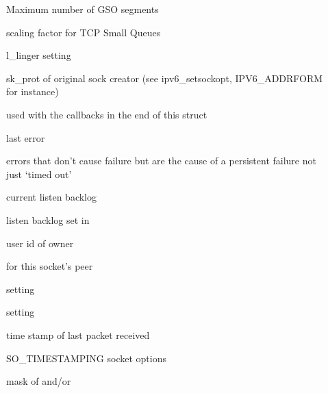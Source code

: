 \documentclass[a4paper,8pt,english]{sphinxmanual}
\begin{document}
\begin{description}
\item[{}] \leavevmode
Maximum number of GSO segments

\item[{}] \leavevmode
scaling factor for TCP Small Queues

\item[{}] \leavevmode
{} l\_linger setting

\item[{}] \leavevmode
sk\_prot of original sock creator (see ipv6\_setsockopt,
IPV6\_ADDRFORM for instance)

\item[{}] \leavevmode
used with the callbacks in the end of this struct

\item[{}] \leavevmode
last error

\item[{}] \leavevmode
errors that don't cause failure but are the cause of a
persistent failure not just `timed out'

\item[{}] \leavevmode
current listen backlog

\item[{}] \leavevmode
listen backlog set in 

\item[{}] \leavevmode
user id of owner

\item[{}] \leavevmode
{} for this socket's peer

\item[{}] \leavevmode
{} setting

\item[{}] \leavevmode
{} setting

\item[{}] \leavevmode
time stamp of last packet received

\item[{}] \leavevmode
SO\_TIMESTAMPING socket options

\item[{}] \leavevmode
mask of  and/or 


\end{description}
\end{document}
